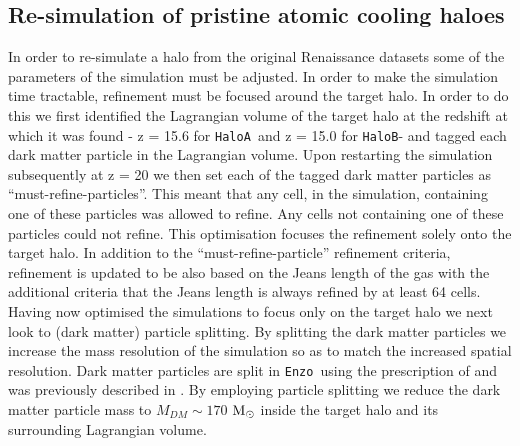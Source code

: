 \documentclass[graphics, twocolumn, usenatbib]{mn2e}
\newcommand{\enzo}{\texttt{Enzo~}}
\newcommand{\msolar} {$\rm{M_{\odot}}~$}
\newcommand{\ha} {\texttt{HaloA~}}
\newcommand{\hbc} {\texttt{HaloB}}
\begin{document}
 \subsection{Re-simulation of pristine atomic cooling haloes} \label{Sec:Resimulation}
 In order to re-simulate a halo from the original Renaissance datasets some of the parameters of the
 simulation  must be adjusted. In order to make the simulation time tractable, refinement
 must be focused around the target halo. In order to do this we first identified the Lagrangian
 volume of the target halo at the redshift at which it was found - z = 15.6 for \ha and z = 15.0
 for \hbc - and tagged each dark matter particle in the Lagrangian volume. Upon restarting
 the simulation subsequently at z = 20 we then set each of the tagged dark matter particles as
 ``must-refine-particles''. This meant that any cell, in the simulation, containing one of these
 particles was allowed to refine. Any cells not containing one of these particles could not refine.
 This optimisation focuses the refinement solely onto the target halo. In addition to the ``must-refine-particle'' refinement criteria,  refinement is updated to be also based on the Jeans length of the
 gas with the additional criteria that the Jeans length is always refined by at least 64 cells. \\ 
 \indent Having now optimised the simulations to focus only on the target halo 
 we next look to (dark matter) particle splitting. By splitting the dark matter
 particles we increase the mass resolution of the simulation so as to match the increased spatial resolution. Dark matter particles are split in \enzo using the prescription of \cite{Kitsionas_2002} and was previously described in \cite{Regan_2015}. By employing particle splitting we reduce the dark matter particle mass to $M_{DM} \sim 170$ \msolar inside the target halo and its surrounding Lagrangian volume.
\end{document}
